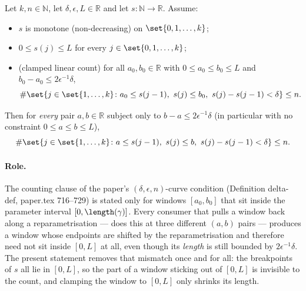 \begin{helper}
  Let $k,n \in \mathbb{N}$, let $\delta,\epsilon,L \in \mathbb{R}$ and let
  $s \colon \mathbb{N} \to \mathbb{R}$. Assume:
  \begin{itemize}
    \item $s$ is monotone (non-decreasing) on $\set{0,1,\dots,k}$;
    \item $0 \le s(j) \le L$ for every $j \in \set{0,1,\dots,k}$;
    \item (clamped linear count) for all $a_0,b_0 \in \mathbb{R}$ with
      $0 \le a_0 \le b_0 \le L$ and $b_0 - a_0 \le 2\epsilon^{-1}\delta$,
      \[
        \#\set{ j \in \set{1,\dots,k} \colon a_0 \le s(j-1),\ s(j) \le b_0,\
          s(j)-s(j-1) < \delta } \le n
        .
      \]
  \end{itemize}
  Then for \emph{every} pair $a,b \in \mathbb{R}$ subject only to $b-a \le 2\epsilon^{-1}\delta$
  (in particular with no constraint $0 \le a \le b \le L$),
  \[
    \#\set{ j \in \set{1,\dots,k} \colon a \le s(j-1),\ s(j) \le b,\ s(j)-s(j-1) < \delta } \le n
    .
  \]

  \paragraph{Role.} The counting clause of the paper's $(\delta,\epsilon,n)$-curve condition
  (Definition delta-def, paper.tex 716--729) is stated only for windows $[a_0,b_0]$ that sit
  inside the parameter interval $[0,\length(\gamma)]$. Every consumer that pulls a window back
  along a reparametrisation --- \noderef{ArcDeltaEpsNCount} does this at three different
  $(a,b)$ pairs --- produces a window whose endpoints are shifted by the reparametrisation and
  therefore need not sit inside $[0,L]$ at all, even though its \emph{length} is still bounded by
  $2\epsilon^{-1}\delta$. The present statement removes that mismatch once and for all: the
  breakpoints of $s$ all lie in $[0,L]$, so the part of a window sticking out of $[0,L]$ is
  invisible to the count, and clamping the window to $[0,L]$ only shrinks its length.
\end{helper}
